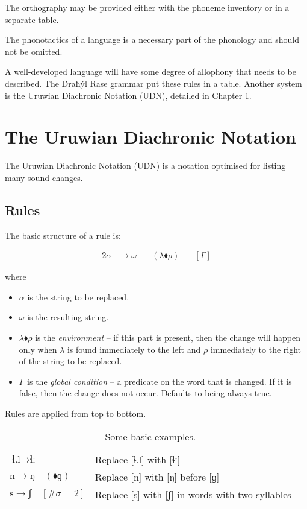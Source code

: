 \documentclass{book}
\begin{document}
The orthography may be provided either with the phoneme inventory or in a separate table.

The phonotactics of a language is a necessary part of the phonology and should not be omitted.

A well-developed language will have some degree of allophony that needs to be described. The Ḋraħýl Rase grammar put these rules in a table. Another system is the Uruwian Diachronic Notation (UDN), detailed in Chapter \ref{chapter:udn}.

\chapter{The Uruwian Diachronic Notation}
\label{chapter:udn}

The Uruwian Diachronic Notation (UDN) is a notation optimised for listing many sound changes.

\section{Rules}

The basic structure of a rule is:

\begin{alignat}{2}
  \alpha &\rightarrow \omega &\quad(\lambda \blacklozenge \rho) &\quad[\Gamma]
\end{alignat}

where

\begin{itemize}
  \item $\alpha$ is the string to be replaced.
  \item $\omega$ is the resulting string.
  \item $\lambda \blacklozenge \rho$ is the \emph{environment} -- if this part is present, then the change will happen only when $\lambda$ is found immediately to the left and $\rho$ immediately to the right of the string to be replaced.
  \item $\Gamma$ is the \emph{global condition} -- a predicate on the word that is changed. If it is false, then the change does not occur. Defaults to being always true.
\end{itemize}

Rules are applied from top to bottom.

\begin{table}[h]
  \caption{Some basic examples.}
  \centering
  \begin{tabu} to \linewidth {|l|X|}
    \hline
    $\text{ɬ.l} \rightarrow \text{ɬː}$ & Replace [ɬ.l] with [ɬː] \\
    $\text{n} \rightarrow \text{ŋ} \quad(\blacklozenge \text{ɡ})$ & Replace [n] with [ŋ] before [ɡ] \\
    $\text{s} \rightarrow \text{ʃ} \quad[\#\sigma = 2]$ & Replace [s] with [ʃ] in words with two syllables \\
    \hline
  \end{tabu}
\end{table}
\end{document}
